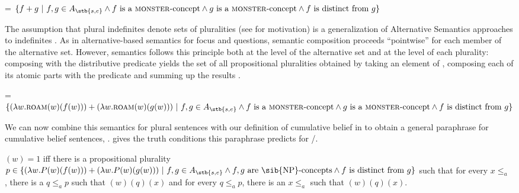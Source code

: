 \documentclass[output=paper]{langscibook}
\begin{document}

\ea \label{sch-has:ex:31}  = $\{f+g\ |\ f, g \in A_{\stb{s, e}} \land f\ \text{is a \textsc{monster}-concept} \land g\ \text{is a \textsc{monster}-concept} \land f\ \text{is distinct from}\ g\}$\z

\noindent The assumption that plural indefinites denote sets of pluralities (see \citealt{Schmitt:2019a} for motivation) is a generalization of Alternative Semantics approaches to indefinites \citep{Kratzer:2002}. As in alternative-based semantics for focus and questions, semantic composition proceeds ``pointwise'' for each member of the alternative set. However,  semantics follows this principle both at the level of the alternative set and at the level of each plurality: composing  with the distributive predicate  yields the set of all propositional pluralities obtained by taking an element of , composing each of its atomic parts with the predicate and summing up the results .

\ea \label{sch-has:ex:32}  = $\{(\lambda w.\textsc{roam}(w)(f(w)))+(\lambda w.\textsc{roam}(w)(g(w)))\ |\ f, g \in A_{\stb{s, e}} \land f\ \text{is a \textsc{monster}-concept} \land g\ \text{is a \textsc{monster}-concept} \land f\ \text{is distinct from}\ g\}$\z

\noindent We can now combine this semantics for plural sentences with our definition of cumulative belief in  to obtain a general paraphrase for cumulative belief sentences, .  gives the truth conditions this paraphrase predicts for /.

\ea \label{sch-has:ex:33} $(w) = 1$ iff there is a propositional plurality $p \in \{(\lambda w.P(w)(f(w)))+(\lambda w.P(w)(g(w)))\ |\ f, g \in A_{\stb{s, e}} \land f, g\ \text{are \sib{NP}-concepts} \land f\ \text{is distinct from}\ g\}$ such that
\ea for every $x \leq_a$ , there is a $q \leq_a p$ such that $(w)(q)(x)$
\ex and for every $q \leq_a p$, there is an $x \leq_a$  such that $(w)(q)(x)$.
\z\z
\end{document}
